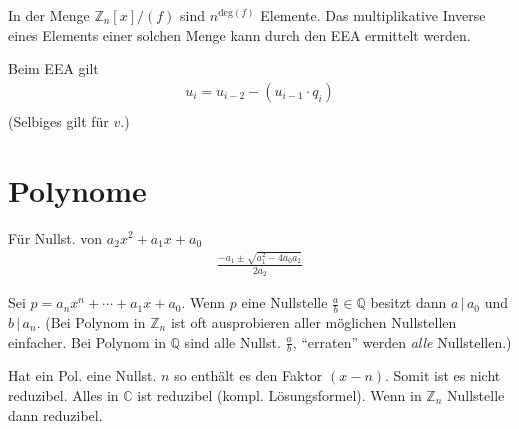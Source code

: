 \documentclass{article}
\begin{document}
\begin{multicols}{2}
In der Menge $\mathbb{Z}_n[x]/(f)$ sind $n^{\text{deg}(f)}$ Elemente. Das multiplikative Inverse eines Elements einer solchen Menge kann durch den EEA ermittelt werden.

Beim EEA gilt
\begin{align*}
    u_i = u_{i - 2} - (u_{i - 1} \cdot q_{i}) \\
\end{align*}
(Selbiges gilt für $v$.)

\section*{Polynome}

Für Nullst. von $a_2x^2 + a_1x + a_0$
\begin{align*}
    \frac{-a_1 \pm \sqrt{a_1^2 - 4a_0a_2}}{2a_2}
\end{align*}

Sei $p = a_nx^n + \cdots + a_1x + a_0$. Wenn $p$ eine Nullstelle $\frac{a}{b} \in \mathbb{Q}$ besitzt dann $a\,|\,a_0$ und $b\,|\,a_n$. (Bei Polynom in $\mathbb{Z}_n$ ist oft ausprobieren aller möglichen Nullstellen einfacher. Bei Polynom in $\mathbb{Q}$ sind alle Nullst. $\frac{a}{b}$, \enquote{erraten} werden \emph{alle} Nullstellen.) 

Hat ein Pol. eine Nullst. $n$ so enthält es den Faktor $(x - n)$. Somit ist es nicht reduzibel. Alles in $\mathbb{C}$ ist reduzibel (kompl. Lösungsformel). Wenn in $\mathbb{Z}_n$ Nullstelle dann reduzibel.

\end{multicols}
\end{document}
